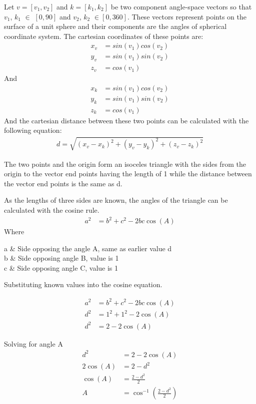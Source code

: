 \noindent Let $v= [v_1, v_2]$ and $k = [k_1, k_2]$ be two component angle-space vectors so that $v_1$, $k_1$ $\in$ $[0,90]$ and $v_2$, $k_2$ $\in [0,360]$. These vectors represent points on the surface of a unit sphere and their components are the angles of spherical coordinate system. The cartesian coordinates of these points are:
	\begin{align}
	x_v &= sin(v_1)cos(v_2)\\
	y_v &= sin(v_1)sin(v_2)\\
	z_v &= cos(v_1)
  \end{align}
  And
  \begin{align}
	x_k &= sin(v_1)cos(v_2)\\
	y_k &= sin(v_1)sin(v_2)\\
	z_k &= cos(v_1)
  \end{align}
\noindent And the cartesian distance between these two points can be calculated with the following equation:
\begin{align}
	d = \sqrt{(x_v-x_k)^2 + (y_v-y_k)^2+(z_v-z_k)^2}
\end{align}


\noindent The two points and the origin form an isoceles triangle with the sides from the origin to the vector end points having the length of 1 while the distance between the vector end points is the same as d.

\newpage
\noindent As the lengths of three sides are known, the angles of the triangle can be calculated with the cosine rule. 
\begin{align}
	a^2 &= b^2 + c^2 - 2bc \cos(A)
\end{align}
Where
\begin{conditions}
 a     &  Side opposing the angle A, same as earlier value d \\
 b     &  Side opposing angle B, value is 1  \\   
 c	   &  Side opposing angle C, value is 1
\end{conditions}
\noindent Substituting known values into the cosine equation.

\begin{align}
	a^2 &= b^2 + c^2 - 2bc \cos(A)\\
	d^2 &= 1^2 + 1^2 - 2 \cos(A) \\
	d^2 &= 2 - 2 \cos(A)
\end{align}

\noindent Solving for angle A
\begin{align}
	d^2 &= 2-2\cos(A)\\
	2 \cos(A) &= 2 -d^2 \\
	\cos(A) &= \frac{2-d^2}{2} \\
	A &= \cos^{-1}(\frac{2-d^2}{2})
\end{align}

